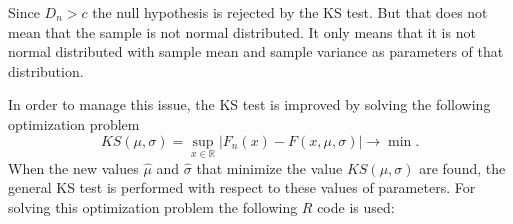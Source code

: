 \documentclass[a4paper, 12pt, titlepage, headsepline, listof = totoc, bibliography = totoc, numbers = noenddot]{scrartcl}
\begin{document}
\begin{Schunk}
\end{Schunk}
Since $D_n>c$ the null hypothesis is rejected by the KS test. But that does not mean
that the sample is not normal distributed. It only means that it is not normal
distributed with sample mean and sample variance as parameters of that
distribution. 

In order to manage this issue, the KS test is improved by solving the following
optimization problem \[KS(\mu,\sigma)=\sup_{x \in
\mathbb{R}}|F_n(x)-F(x,\mu,\sigma)|\to \min.\]
When the new values $\hat{\mu}$ and $\hat{\sigma}$ that minimize the value
$KS(\mu,\sigma)$ are found, the general KS test is performed with respect to
these values of parameters. For solving this optimization problem the following
$R$ code is used:
\end{document}
